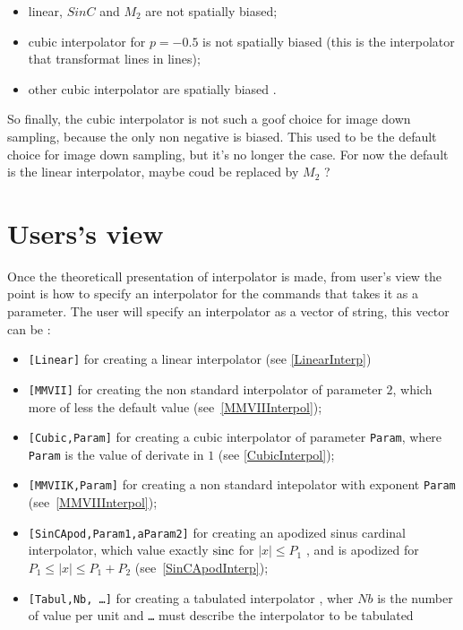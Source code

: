\begin{itemize}
    \item  linear, $SinC$ and   $M_2$  are not spatially biased;

    \item  cubic interpolator for $p=-0.5$ is not spatially biased (this is the interpolator that
           transformat lines in lines);

    \item  other cubic interpolator are spatially biased .
\end{itemize}

So finally, the cubic interpolator is not such a goof choice for image down sampling, 
because the only  non negative  is biased.  This used to be the default choice for
image down sampling, but it's no longer the case. For now the default is the linear
interpolator, maybe coud be replaced by $M_2$ ?



\section{Users's view}

\label{InterpUserView}

Once the theoreticall presentation of interpolator is made, from user's view the point is
how to specify an interpolator for the commands that takes it as a parameter.
The user will specify an interpolator as a  vector of string, this vector can be :

\begin{itemize}
    \item {\tt [Linear]}  for creating a linear interpolator (see \ref{LinearInterp})
    \item {\tt [MMVII]}  for creating the non standard interpolator of parameter $2$, which more of less the default value 
                         (see~\ref{MMVIIInterpol});
    \item {\tt [Cubic,Param]} for creating a cubic interpolator of parameter {\tt Param}, where {\tt Param} is the value
          of derivate in $1$ (see  \ref{CubicInterpol});
    \item {\tt [MMVIIK,Param]} for creating a non standard intepolator with exponent {\tt Param} 
                         (see~\ref{MMVIIInterpol});
    \item {\tt [SinCApod,Param1,aParam2]}  for creating an apodized sinus cardinal interpolator, which value exactly
         $\operatorname{sinc}$ for    $ |x| \leq P_1$  , and is apodized for   $ P_1\leq |x| \leq P_1+P_2$
                         (see~\ref{SinCApodInterp});
    \item {\tt [Tabul,Nb, \dots ]} for creating a tabulated interpolator , wher  $Nb$ is the number of value per unit  
          and {\tt \dots} must describe the interpolator to be tabulated
\end{itemize}

